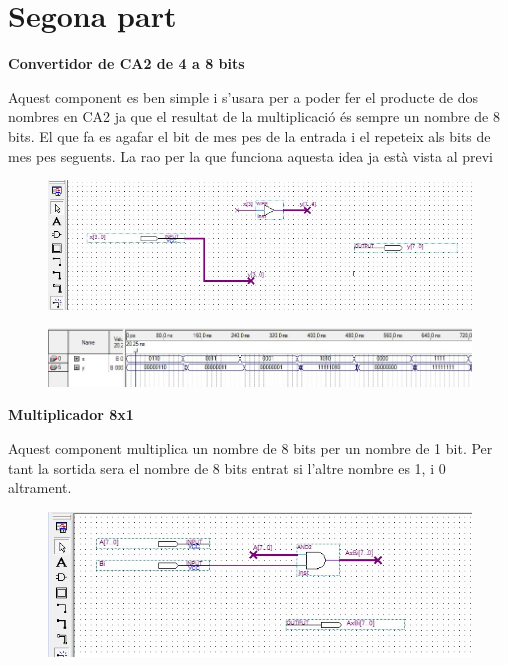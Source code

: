 \documentclass[12pt, a4papre]{article}
\begin{document}
	
	\newpage
	\section{Segona part}
	\textbf{\large{Convertidor de CA2 de 4 a 8 bits}}
	
	Aquest component es ben simple i s'usara per a poder fer el producte de dos nombres en CA2 ja que el resultat de la multiplicació és sempre un nombre de 8 bits. El que fa es agafar el bit de mes pes de la entrada i el repeteix als bits de mes pes seguents. La rao per la que funciona aquesta idea ja està vista al previ
	
	\begin{figure}[H]
		\begin{center}
		\includegraphics[width=150mm]{CA2_4_a_8.jpeg}
		\end{center}
	\end{figure}
	\begin{figure}[H]
		\begin{center}
		\includegraphics[width=150mm]{CA2_4A8simul.jpeg}
		\end{center}
	\end{figure}
	
	\textbf{\large{Multiplicador 8x1}}
	
	Aquest component multiplica un nombre de 8 bits per  un nombre de 1 bit. Per tant la sortida sera el nombre de 8 bits entrat si l'altre nombre es 1, i 0 altrament.
	
	\begin{figure}[H]
		\begin{center}
		\includegraphics[width=150mm]{MULT8x1.jpeg}
		\end{center}
	\end{figure}
	
\end{document}
